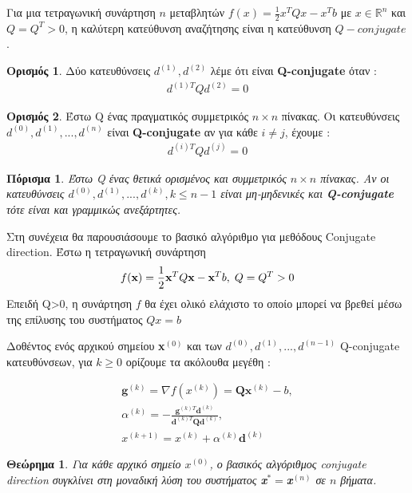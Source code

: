 \documentclass[a4paper,12pt,twoside]{report}
\theoremstyle{plain}
\newtheorem{thm}{Θεώρημα}[section] %
\newtheorem{cor}{Πόρισμα}[section]
\theoremstyle{definition}
\newtheorem{defn}{Ορισμός}[section] %
\theoremstyle{remark}
\begin{document}
Για μια τετραγωνική συνάρτηση $n$ μεταβλητών $f(x) = \frac{1}{2}x^TQx-x^Tb$ με $x\in \mathbb{R}^n$ και $Q=Q^T>0$, η καλύτερη κατεύθυνση αναζήτησης είναι η κατεύθυνση $Q-conjugate$.

\begin{defn}\label{qcon}
Δύο κατευθύνσεις $d^{(1)}, d^{(2)}$ λέμε ότι είναι \textbf{Q-conjugate} όταν : \begin{align*}
d^{(1)T}Qd^{(2)} = 0
\end{align*}
\end{defn}

\begin{defn}
Έστω Q ένας πραγματικός συμμετρικός $n\times n$ πίνακας. Οι κατευθύνσεις $d^{(0)}, d^{(1)}, ..., d^{(n)}$ είναι \textbf{Q-conjugate} αν για κάθε $i\neq j$, έχουμε :
\begin{align*}
d^{(i)T}Qd^{(j)} = 0
\end{align*}
\end{defn}

\begin{cor}
Έστω Q ένας θετικά ορισμένος και συμμετρικός $n\times n$ πίνακας. Αν οι κατευθύνσεις $d^{(0)}, d^{(1)}, ..., d^{(k)}, k\leq n-1$ είναι μη-μηδενικές και \textbf{Q-conjugate} τότε είναι και γραμμικώς ανεξάρτητες.
\end{cor}

Στη συνέχεια θα παρουσιάσουμε το βασικό αλγόριθμο για μεθόδους Conjugate direction. Έστω η τετραγωνική συνάρτηση 
\begin{align*}
f(\textbf{x}) = \frac{1}{2}\textbf{x}^TQ\textbf{x}-\textbf{x}^Tb, \hspace{0.1cm} Q=Q^T>0
\end{align*}
Επειδή Q>0, η συνάρτηση $f$ θα έχει ολικό ελάχιστο το οποίο μπορεί να βρεθεί μέσω της επίλυσης του συστήματος $Qx = b$

Δοθέντος ενός αρχικού σημείου \textbf{x}$^{(0)}$ και των $d^{(0)}, d^{(1)}, ..., d^{(n-1)}$ Q-conjugate κατευθύνσεων, για $k\geq 0$ ορίζουμε τα ακόλουθα μεγέθη :

\begin{align}
\textbf{g}^{(k)} = \nabla f(x^{(k)}) = \textbf{Q}\textbf{x}^{(k)}-b,\\
\alpha ^{(k)} = -\frac{\textbf{g}^{(k)T}\textbf{d}^{(k)}}{\textbf{d}^{(k)T}\textbf{Q}\textbf{d}^{(k)}},\\
x^{(k+1)} = x^{(k)} + \alpha ^{(k)}\textbf{d}^{(k)}
\end{align}

\begin{thm}
Για κάθε αρχικό σημείο $x^{(0)}$, ο βασικός αλγόριθμος conjugate direction συγκλίνει στη μοναδική λύση του συστήματος \textbf{x}$^{*} = $\textbf{x}$^{(n)}$ σε $n$ βήματα.
\end{thm}
\end{document}

